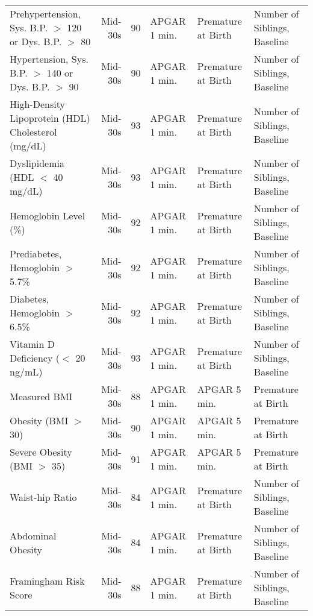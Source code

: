\begin{tabular}{l r r l l l}
 Prehypertension, Sys. B.P. $>$ 120 or Dys. B.P. $>$ 80	&	Mid-30s	&	90	&	APGAR 1 min. & Premature at Birth & Number of Siblings, Baseline	\\
 Hypertension, Sys. B.P. $>$ 140 or Dys. B.P. $>$ 90	&	Mid-30s	&	90	&	APGAR 1 min. & Premature at Birth & Number of Siblings, Baseline	\\
 High-Density Lipoprotein (HDL) Cholesterol (mg/dL)	&	Mid-30s	&	93	&	APGAR 1 min. & Premature at Birth & Number of Siblings, Baseline	\\
 Dyslipidemia (HDL $<$ 40 mg/dL)	&	Mid-30s	&	93	&	APGAR 1 min. & Premature at Birth & Number of Siblings, Baseline	\\
 Hemoglobin Level (\%)	&	Mid-30s	&	92	&	APGAR 1 min. & Premature at Birth & Number of Siblings, Baseline	\\
 Prediabetes, Hemoglobin $>$ 5.7\%	&	Mid-30s	&	92	&	APGAR 1 min. & Premature at Birth & Number of Siblings, Baseline	\\
 Diabetes, Hemoglobin $>$ 6.5\%	&	Mid-30s	&	92	&	APGAR 1 min. & Premature at Birth & Number of Siblings, Baseline	\\
 Vitamin D Deficiency ($<$ 20 ng/mL)	&	Mid-30s	&	93	&	APGAR 1 min. & Premature at Birth & Number of Siblings, Baseline	\\
Measured BMI	&	Mid-30s	&	88	&	APGAR 1 min. & APGAR 5 min. & Premature at Birth \\
 Obesity (BMI $>$ 30)	&	Mid-30s	&	90	&	APGAR 1 min. & APGAR 5 min. & Premature at Birth \\
 Severe Obesity (BMI $>$ 35)	&	Mid-30s	&	91	&	APGAR 1 min. & APGAR 5 min. & Premature at Birth \\
 Waist-hip Ratio	&	Mid-30s	&	84	& APGAR 1 min. & Premature at Birth & Number of Siblings, Baseline \\
 Abdominal Obesity	&	Mid-30s	&	84	& APGAR 1 min. & Premature at Birth & Number of Siblings, Baseline \\
 Framingham Risk Score	&	Mid-30s	&	88	& APGAR 1 min. & Premature at Birth & Number of Siblings, Baseline \\

\bottomrule											
\end{tabular}